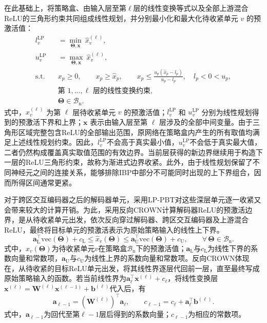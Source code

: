 在此基础上，将策略盒、由输入层至第\(\ell\)层的线性变换等式以及全部上游混合ReLU的三角形约束共同组成线性规划，并分别最小化和最大化待收紧单元 \(v\) 的预激活值：
\begin{equation}
\begin{aligned}
l_{v}^{\mathrm{LP}}
&=
\min_{\bm{\Theta},\bm{x}}\ 
\hat{x}_{v}^{(\ell)},\\
u_{v}^{\mathrm{LP}}
&=
\max_{\bm{\Theta},\bm{x}}\ 
\hat{x}_{v}^{(\ell)},\\
\mathrm{s.t.}\quad
&x_p\geq0,\qquad
x_p\geq\hat{x}_p,\qquad
x_p\leq
\frac{u_p(\hat{x}_p-l_p)}{u_p-l_p},
\quad l_p<0<u_p,\\
&\text{第 }1,\ldots,\ell\text{ 层的线性变换约束},\\
&\bm{\Theta}\in\mathcal{B}_{\mathrm{n}}.
\end{aligned}
\label{eq.opt.pbt}
\end{equation}
式中，\(\hat{x}_{v}^{(\ell)}\) 为第 \(\ell\) 层待收紧单元 \(v\) 的预激活值；\(l_v^{\mathrm{LP}}\) 和 \(u_v^{\mathrm{LP}}\) 分别为线性规划得到的预激活下界和上界；\(\bm{x}\) 表示由输入层至第 \(\ell\) 层涉及的全部中间变量。由于三角形区域完整包含ReLU的全部输出范围，原网络在策略盒内产生的所有取值均满足上述线性规划约束。因此，$l_v^{\mathrm{LP}}$不会高于真实最小值，$u_v^{\mathrm{LP}}$不会低于真实最大值，二者仍然构成覆盖真实取值范围的有效边界。当前层获得的新边界继续用于构造下一层的ReLU三角形约束，故称为渐进式边界收紧。此外，由于线性规划保留了不同神经元之间的连接关系，能够排除IBP中部分不可能同时出现的上下界组合，因而所得区间通常更紧。

对于跨区交互编码器之后的解码器单元，采用LP-PBT对这些深层单元逐一收紧又会带来较大的计算开销。为此，采用反向CROWN计算解码器ReLU的预激活边界，是从待收紧单元出发，依次反向穿过解码器、跨区交互编码器及上游混合ReLU，最终将目标单元的预激活表示为原始策略输入的线性上下界。
\begin{equation}
\bm a_{\mathrm L}^{\top}\mathrm{vec}(\bm\Theta)+c_{\mathrm L}
\leq
\hat x_v(\bm\Theta)
\leq
\bm a_{\mathrm U}^{\top}\mathrm{vec}(\bm\Theta)+c_{\mathrm U},
\qquad
\forall\,\bm\Theta\in\mathcal B_{\mathrm n}.
\label{eq.opt.crowngoal}
\end{equation}
式中，$\hat x_v(\bm\Theta)$为待收紧单元$v$在策略盒$\mathcal B_{\mathrm n}$下的预激活值；$\bm a_{\mathrm L}$与$c_{\mathrm L}$为线性下界的系数向量和常数项，$\bm a_{\mathrm U}$与$c_{\mathrm U}$为线性上界的系数向量和常数项。反向CROWN体现在，从待收紧的目标ReLU单元出发，将其线性界逐层代回前一层，直至最终写成原始策略输入的函数。若当前线性界为$\bm a_{\ell}^{\top}\bm x^{(\ell)}+c_{\ell}$，将线性变换层$\bm x^{(\ell)}=\bm W^{(\ell)}\bm x^{(\ell-1)}+\bm b^{(\ell)}$代入后，有
\begin{equation}
\bm a_{\ell-1}
=\left(\bm W^{(\ell)}\right)^{\top}\bm a_{\ell},
\qquad
c_{\ell-1}
=c_{\ell}
+\bm a_{\ell}^{\top}\bm b^{(\ell)}.
\label{eq.opt.crownlinear}
\end{equation}
式中，$\bm a_{\ell-1}$为回代至第$\ell-1$层后得到的系数向量；$c_{\ell-1}$为相应的常数项。

